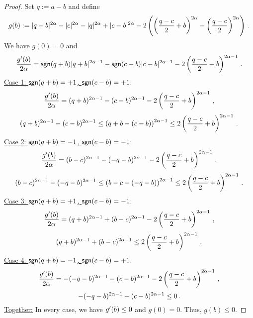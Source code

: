 \begin{proof}
	Set $q:= a-b$ and define
	\begin{equation*}
		g(b) :=  |q+b|^{2\alpha}-|c|^{2\alpha}-|q|^{2\alpha}+|c-b|^{2\alpha} - 2\left( \left( \frac{q-c}{2}+b \right)^{2\alpha}-\left( \frac{q-c}{2} \right)^{2\alpha} \right)
		\, .
	\end{equation*}
	We have $g(0)=0$
	and
	\begin{equation*}
		\frac{g^\prime(b)}{2\alpha} = \mathsf{sgn}(q+b)|q+b|^{2\alpha-1}-\mathsf{sgn}(c-b)|c-b|^{2\alpha-1} -
						2\left( \frac{q-c}{2}+b \right)^{2\alpha-1}
		\, .
	\end{equation*}
	\underline{Case 1: $\mathsf{sgn}(q+b) = +1$, $\mathsf{sgn}(c-b)=+1$}:
		\begin{equation*}
			\frac{g^\prime(b)}{2\alpha} = (q+b)^{2\alpha-1}-(c-b)^{2\alpha-1} -
							2\left( \frac{q-c}{2}+b \right)^{2\alpha-1}
			\, ,
		\end{equation*}
		\begin{equation*}
			(q+b)^{2\alpha-1}-(c-b)^{2\alpha-1} \leq \left( q+b-(c-b) \right)^{2\alpha-1}\leq 2\left( \frac{q-c}{2}+b \right)^{2\alpha-1}
			\, .
		\end{equation*}
	\underline{Case 2: $\mathsf{sgn}(q+b) = -1$, $\mathsf{sgn}(c-b)=-1$}:
		\begin{equation*}
			\frac{g^\prime(b)}{2\alpha} = (b-c)^{2\alpha-1}-(-q-b)^{2\alpha-1}
							-2\left( \frac{q-c}{2}+b \right)^{2\alpha-1}
			\, ,
		\end{equation*}
		\begin{equation*}
			(b-c)^{2\alpha-1}-(-q-b)^{2\alpha-1} \leq \left( b-c-(-q-b) \right)^{2\alpha-1}\leq 2\left( \frac{q-c}{2}+b \right)^{2\alpha-1}
			\, .
		\end{equation*}
	\underline{Case 3: $\mathsf{sgn}(q+b) = +1$, $\mathsf{sgn}(c-b)=-1$}:
		\begin{equation*}
			\frac{g^\prime(b)}{2\alpha} = (q+b)^{2\alpha-1}+(b-c)^{2\alpha-1} -
									2\left( \frac{q-c}{2}+b \right)^{2\alpha-1}
									\, ,
		\end{equation*}
		\begin{equation*}
			(q+b)^{2\alpha-1}+(b-c)^{2\alpha-1} \leq 2\left( \frac{q-c}{2}+b \right)^{2\alpha-1}
			\, .
		\end{equation*}
	\underline{Case 4: $\mathsf{sgn}(q+b) = -1$, $\mathsf{sgn}(c-b)=+1$}:
		\begin{equation*}
			\frac{g^\prime(b)}{2\alpha} = -(-q-b)^{2\alpha-1}-(c-b)^{2\alpha-1} -
									2\left( \frac{q-c}{2}+b \right)^{2\alpha-1}
									\, ,
		\end{equation*}
		\begin{equation*}
			-(-q-b)^{2\alpha-1}-(c-b)^{2\alpha-1} \leq 0
			\, .
		\end{equation*}
	\underline{Together:}
	In every case, we have $g^\prime(b) \leq 0$ and $g(0)=0$. Thus, $g(b) \leq 0$.
\end{proof}
%
%
%
